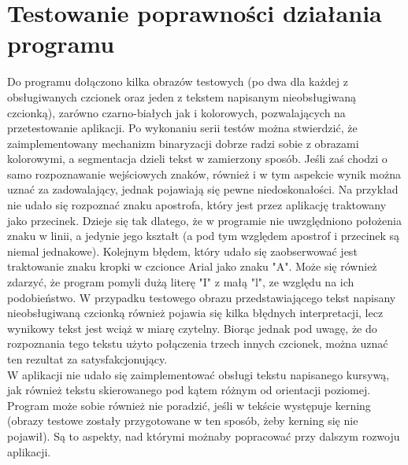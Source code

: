 \section{Testowanie poprawności działania programu}
Do programu dołączono kilka obrazów testowych (po dwa dla każdej z obsługiwanych czcionek oraz jeden z tekstem napisanym nieobsługiwaną czcionką), zarówno czarno-białych jak i kolorowych,  pozwalających na przetestowanie aplikacji. Po wykonaniu serii testów można stwierdzić, że zaimplementowany mechanizm binaryzacji dobrze radzi sobie z obrazami kolorowymi, a segmentacja dzieli tekst w zamierzony sposób. Jeśli zaś chodzi o samo rozpoznawanie wejściowych znaków, również i w tym aspekcie wynik można uznać za zadowalający, jednak pojawiają się pewne niedoskonałości. Na przykład nie udało się rozpoznać znaku apostrofa, który jest przez aplikację traktowany jako przecinek. Dzieje się tak dlatego, że w programie nie uwzględniono położenia znaku w linii, a jedynie jego kształt (a pod tym względem apostrof i przecinek są niemal jednakowe). Kolejnym błędem, który udało się zaobserwować jest traktowanie znaku kropki w czcionce Arial jako znaku "A". Może się również zdarzyć, że program pomyli dużą literę "I" z małą "l", ze względu na ich podobieństwo. W przypadku testowego obrazu przedstawiającego tekst napisany nieobsługiwaną czcionką również pojawia się kilka błędnych interpretacji, lecz wynikowy tekst jest wciąż w miarę czytelny. Biorąc jednak pod uwagę, że do rozpoznania tego tekstu użyto połączenia trzech innych czcionek, można uznać ten rezultat za satysfakcjonujący.\\

W aplikacji nie udało się zaimplementować obsługi tekstu napisanego kursywą, jak również tekstu skierowanego pod kątem różnym od orientacji poziomej. Program może sobie również nie poradzić, jeśli w tekście występuje kerning (obrazy testowe zostały przygotowane w ten sposób, żeby kerning się nie pojawił). Są to aspekty, nad którymi możnaby popracować przy dalszym rozwoju aplikacji.


